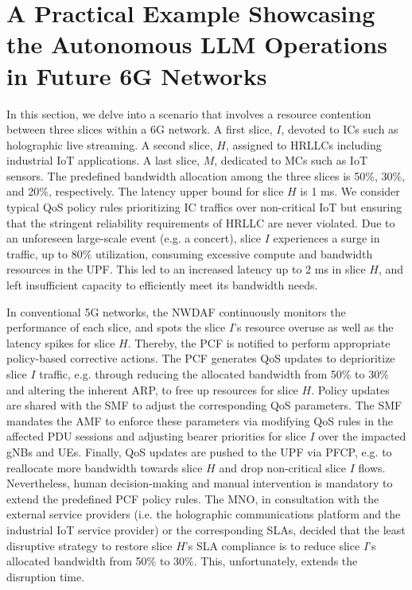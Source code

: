 \section{A Practical Example Showcasing the Autonomous \gls{LLM} Operations in Future 6G Networks}
\label{sec:LLM_applications}
In this section, we delve into a scenario that involves a resource contention between three slices within a 6G network. A first slice, $I$, devoted to \glspl{IC} such as holographic live streaming. A second slice, $H$, assigned to \glspl{HRLLC} including industrial \gls{IoT} applications. A last slice, $M$, dedicated to \glspl{MC} such as \gls{IoT} sensors. The predefined bandwidth allocation among the three slices is 50\%, 30\%, and 20\%, respectively. The latency upper bound for slice $H$ is 1 ms. We consider typical \gls{QoS} policy rules prioritizing \gls{IC} traffics over non-critical \gls{IoT} but ensuring that the stringent reliability requirements of \gls{HRLLC} are never violated. Due to an unforeseen large-scale event (e.g. a concert), slice $I$ experiences a surge in traffic, up to 80\% utilization, consuming excessive compute and bandwidth resources in the \gls{UPF}. This led to an increased latency up to 2 ms in slice $H$, and left insufficient capacity to efficiently meet its bandwidth needs.

In conventional 5G networks, the \gls{NWDAF} continuously monitors the performance of each slice, and spots the slice $I$'s resource overuse as well as the latency spikes for slice $H$. Thereby, the \gls{PCF} is notified to perform appropriate policy-based corrective actions. The \gls{PCF} generates \gls{QoS} updates to deprioritize slice $I$ traffic, e.g. through reducing the allocated bandwidth from 50\% to 30\% and altering the inherent \gls{ARP}, to free up resources for slice $H$. Policy updates are shared with the \gls{SMF} to adjust the corresponding \gls{QoS} parameters. The \gls{SMF} mandates the \gls{AMF} to enforce these parameters via modifying \gls{QoS} rules in the affected \gls{PDU} sessions and adjusting bearer priorities for slice $I$ over the impacted gNBs and UEs. Finally, \gls{QoS} updates are pushed to the \gls{UPF} via \gls{PFCP}, e.g. to reallocate more bandwidth towards slice $H$ and drop non-critical slice $I$ flows. Nevertheless, human decision-making and manual intervention is mandatory to extend the predefined \gls{PCF} policy rules. The \gls{MNO}, in consultation with the external service providers (i.e. the holographic communications platform and the industrial \gls{IoT} service provider) or the corresponding \glspl{SLA}, decided that the least disruptive strategy to restore slice $H$'s \gls{SLA} compliance is to reduce slice $I$'s allocated bandwidth from 50\% to 30\%. This, unfortunately, extends the disruption time.


